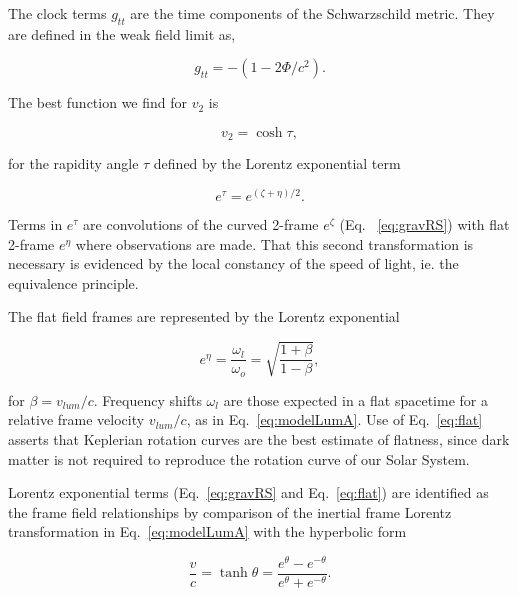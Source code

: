\documentclass[reprint,%
 amsmath,amssymb,
 aps,
]{revtex4-1}
\begin{document}
 The clock terms $g_{tt}$  are the time components of the  Schwarzschild metric.  They are defined in the   weak field limit  \cite{Hartle} as, 
 
  \begin{equation}
      g_{tt}= -( 1 - 2\Phi/ c^2).
      \label{clocktime}
  \end{equation} 
  

The best   function we find  for  $v_2$ is 

\begin{equation}
v_{2} =  \cosh \tau, 
\label{eq:hyperbolico}
\end{equation}

 for the rapidity angle $\tau$ defined by the    Lorentz exponential  term  
  
 
\begin{equation}
    e^{\tau}=   e^{(\zeta+\eta)/2}.
\end{equation}
 
Terms in $e^{\tau}$ are  convolutions of the curved 2-frame $e^\zeta$ (Eq.~ \ref{eq:gravRS})  with flat 2-frame $e^\eta$ where observations are made.  That this second transformation  is necessary is evidenced by the local constancy of the speed of light, ie. the equivalence principle. 

  The flat field frames  are represented by the
Lorentz exponential  

\begin{equation}
    e^{\eta}=\frac{\omega_{l}}{\omega_o}= \sqrt{\frac{1+\beta}{1-\beta}},
    \label{eq:flat}
\end{equation}  
     
for $\beta = v_{lum}/c$. 
Frequency shifts $\omega_{l}$ are those expected   
in a flat spacetime for a relative frame velocity   $v_{lum}/c$, 
as in Eq.~\ref{eq:modelLumA}.  
Use of Eq.~\ref{eq:flat} asserts  that Keplerian rotation curves are     the best estimate of flatness, since dark matter is not required to  reproduce the rotation curve of our Solar System.
 
  Lorentz exponential terms (Eq.~\ref{eq:gravRS} and Eq.~\ref{eq:flat})
  are    identified  as the  frame field relationships   by  comparison of 
     the inertial frame Lorentz transformation in  Eq.~\ref{eq:modelLumA} with 
the  hyperbolic form \cite{rindler2013essential} 


     \begin{equation}
         \frac{v}{c} = \tanh \theta = \frac{e^\theta - e^{-\theta}}{e^\theta + e^{-\theta}} .   
         \label{boost}
     \end{equation} 
\end{document}
